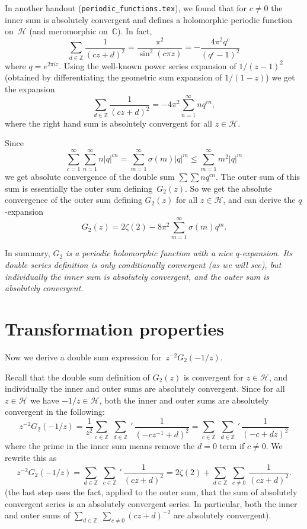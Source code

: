 \documentclass {amsart}
\theoremstyle{plain}
\theoremstyle{definition}
\theoremstyle{remark}
\newcommand{\bZ}{{\mathbb{Z}}}
\newcommand{\bC}{{\mathbb{C}}}
\newcommand{\h}{{\mathcal{H}}}
\begin{document}
In another handout (\texttt{periodic\_functions.tex}), we found that for $c \ne 0$ the inner sum
is absolutely convergent and defines a holomorphic periodic function on~$\h$ (and meromorphic on~$\bC$). In fact,
$$
\sum_{d \in \bZ}  \frac{1}{(c z + d)^2} = \frac{\pi^2}{\sin^2 (c \pi z)} = - \frac{4 \pi^2 q^c}{(q^c - 1)^2}
$$
where $q = e^{2 \pi i z}$. Using the well-known power series expansion of $1/(z-1)^2$ (obtained by differentiating the geometric sum expansion of $1/(1-z)$) we get the expansion
$$
\sum_{d \in \bZ}  \frac{1}{(c z + d)^2} =  - 4 \pi^2 \sum_{n=1}^\infty n q^{c n},
$$
where the right hand sum is absolutely convergent for all $z \in \h$.

Since
$$
\sum_{c = 1}^\infty \sum_{n=1}^\infty n |q|^{cn} = \sum_{m = 1}^\infty \sigma(m) |q|^{m}
\le 
\sum_{m = 1}^\infty m^2 |q|^{m}
$$
we get absolute convergence of the double sum
$
\sum \sum n q^{c n}.
$
The outer sum of this sum is essentially the outer sum defining~$G_2(z)$.
So we get the absolute convergence of the outer sum defining $G_2(z)$
for all $z \in \h$, and can derive the $q$-expansion
$$
G_2 (z) 
= 2 \zeta (2) - 8\pi^2  \sum_{m = 1}^\infty \sigma(m) q^{m}.
$$

In summary, \emph{$G_2$ is a periodic holomorphic function
with a nice $q$-expansion. Its double series definition is only conditionally convergent (as
we will see), but individually the inner sum is absolutely convergent, and the outer
sum is absolutely convergent.}


\section {Transformation properties}

Now we derive a double sum expression for~$z^{-2} G_2(-1/z)$.

Recall that the double sum definition of $G_2(z)$ is convergent for $z\in\h$, and
individually the inner and outer sums are absolutely convergent.
Since for all $z\in\h$ we have $-1/z \in \h$, both the inner and outer
sums are absolutely convergent  in the following:
$$
z^{-2} G_2 (-1/z) = \frac{1}{z^2} \sum_{c \in \bZ} \; \sum_{d \in \bZ}  \,'\, \frac{1}{(- c z^{-1} + d)^2}
=
\sum_{c \in \bZ} \; \sum_{d \in \bZ}  \,'\, \frac{1}{(- c + d z)^2}
$$
where the prime in the inner sum means remove the $d=0$ term
if $c \ne 0$.
We rewrite this as
$$
z^{-2} G_2 (-1/z) = 
\sum_{d \in \bZ} \; \sum_{c \in \bZ}  \,'\, \frac{1}{(c z + d)^2}
=
2 \zeta(2) + \sum_{d \in \bZ} \; \sum_{c \ne 0}  \, \frac{1}{(c z + d)^2} 
.
$$
(the last step uses the fact, applied to the outer sum, that the sum of absolutely
convergent series is an absolutely convergent series. In particular, 
both the inner and outer
sums of $ \sum_{d \in \bZ} \; \sum_{c \ne 0}  {(c z + d)^{-2}}$
are absolutely convergent).
\end{document}
